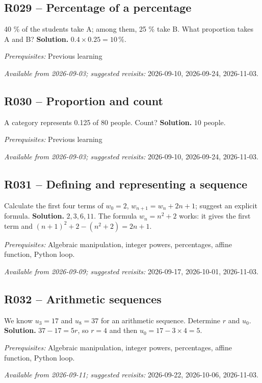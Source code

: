 \subsection*{R029 -- Percentage of a percentage}\label{R029}
40 \% of the students take A; among them, 25 \% take B. What proportion takes A and B?
\ifprof\textbf{Solution.} $0.4\times0.25=10\,\%$.\par\textit{Prerequisites:} Previous learning\par\textit{Available from 2026-09-03; suggested revisits:} 2026-09-10, 2026-09-24, 2026-11-03.\fi
{}\subsection*{R030 -- Proportion and count}\label{R030}
A category represents 0.125 of 80 people. Count?
\ifprof\textbf{Solution.} $10$ people.\par\textit{Prerequisites:} Previous learning\par\textit{Available from 2026-09-03; suggested revisits:} 2026-09-10, 2026-09-24, 2026-11-03.\fi
{}\subsection*{R031 -- Defining and representing a sequence}\label{R031}
Calculate the first four terms of $w_0=2$, $w_{n+1}=w_n+2n+1$; suggest an explicit formula.
\ifprof\textbf{Solution.} $2,3,6,11$. The formula $w_n=n^2+2$ works: it gives the first term and $(n+1)^2+2-(n^2+2)=2n+1$.\par\textit{Prerequisites:} Algebraic manipulation, integer powers, percentages, affine function, Python loop.\par\textit{Available from 2026-09-09; suggested revisits:} 2026-09-17, 2026-10-01, 2026-11-03.\fi
{}\subsection*{R032 -- Arithmetic sequences}\label{R032}
We know $u_3=17$ and $u_8=37$ for an arithmetic sequence. Determine $r$ and $u_0$.
\ifprof\textbf{Solution.} $37-17=5r$, so $r=4$ and then $u_0=17-3\times4=5$.\par\textit{Prerequisites:} Algebraic manipulation, integer powers, percentages, affine function, Python loop.\par\textit{Available from 2026-09-11; suggested revisits:} 2026-09-22, 2026-10-06, 2026-11-03.\fi
